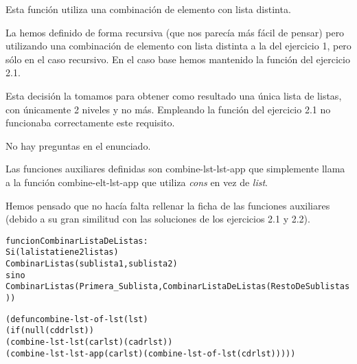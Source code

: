 \begin{aibox}{\comments}
Esta función utiliza una combinación de elemento con lista distinta. 

La hemos definido de forma recursiva (que nos parecía más fácil de pensar) pero utilizando una combinación de elemento con lista distinta a la del ejercicio 1, pero sólo en el caso recursivo. En el caso base hemos mantenido la función del ejercicio 2.1. 

Esta decisión la tomamos para obtener como resultado una única lista de listas, con únicamente 2 niveles y no más. Empleando la función del ejercicio 2.1 no funcionaba correctamente este requisito.

\end{aibox}
\begin{aibox}{\answers}
No hay preguntas en el enunciado.
\end{aibox}
\begin{aibox}{\othercomments}

Las funciones auxiliares definidas son combine-lst-lst-app que simplemente llama a la función combine-elt-lst-app que utiliza \emph{cons} en vez de \emph{list}.

Hemos pensado que no hacía falta rellenar la ficha de las funciones auxiliares (debido a su gran similitud con las soluciones de los ejercicios 2.1 y 2.2).

\end{aibox}
\begin{aibox}{\pseudocode}
\begin{alltt}
funcion CombinarListaDeListas:
	Si (la lista tiene 2 listas)
		CombinarListas(sublista1,sublista2)
	sino
		CombinarListas (Primera\_Sublista, CombinarListaDeListas (RestoDeSublistas))
\end{alltt}
\end{aibox}
\begin{aibox}{\code}

\begin{alltt}
(defun combine-lst-of-lst (lst)
    (if (null (cddr lst))
            (combine-lst-lst (car lst) (cadr lst))
    (combine-lst-lst-app (car lst) (combine-lst-of-lst (cdr lst)))))

\end{alltt}
\end{aibox}
